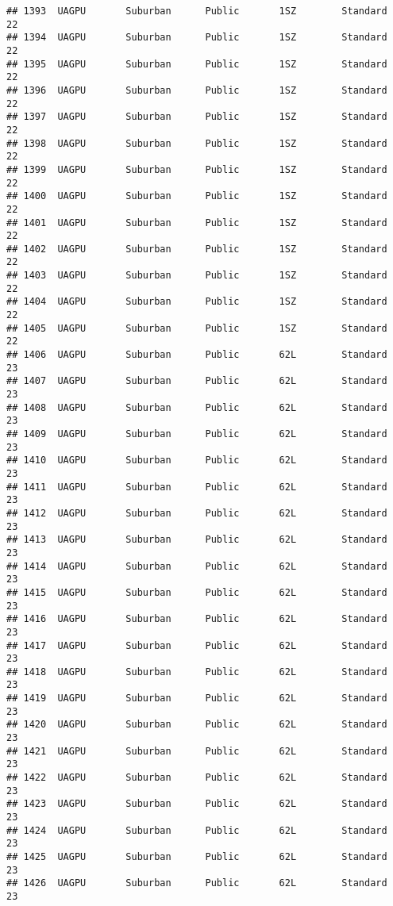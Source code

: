 \documentclass[
]{article}
\begin{document}
\begin{verbatim}
## 1393  UAGPU       Suburban      Public       1SZ        Standard        22
## 1394  UAGPU       Suburban      Public       1SZ        Standard        22
## 1395  UAGPU       Suburban      Public       1SZ        Standard        22
## 1396  UAGPU       Suburban      Public       1SZ        Standard        22
## 1397  UAGPU       Suburban      Public       1SZ        Standard        22
## 1398  UAGPU       Suburban      Public       1SZ        Standard        22
## 1399  UAGPU       Suburban      Public       1SZ        Standard        22
## 1400  UAGPU       Suburban      Public       1SZ        Standard        22
## 1401  UAGPU       Suburban      Public       1SZ        Standard        22
## 1402  UAGPU       Suburban      Public       1SZ        Standard        22
## 1403  UAGPU       Suburban      Public       1SZ        Standard        22
## 1404  UAGPU       Suburban      Public       1SZ        Standard        22
## 1405  UAGPU       Suburban      Public       1SZ        Standard        22
## 1406  UAGPU       Suburban      Public       62L        Standard        23
## 1407  UAGPU       Suburban      Public       62L        Standard        23
## 1408  UAGPU       Suburban      Public       62L        Standard        23
## 1409  UAGPU       Suburban      Public       62L        Standard        23
## 1410  UAGPU       Suburban      Public       62L        Standard        23
## 1411  UAGPU       Suburban      Public       62L        Standard        23
## 1412  UAGPU       Suburban      Public       62L        Standard        23
## 1413  UAGPU       Suburban      Public       62L        Standard        23
## 1414  UAGPU       Suburban      Public       62L        Standard        23
## 1415  UAGPU       Suburban      Public       62L        Standard        23
## 1416  UAGPU       Suburban      Public       62L        Standard        23
## 1417  UAGPU       Suburban      Public       62L        Standard        23
## 1418  UAGPU       Suburban      Public       62L        Standard        23
## 1419  UAGPU       Suburban      Public       62L        Standard        23
## 1420  UAGPU       Suburban      Public       62L        Standard        23
## 1421  UAGPU       Suburban      Public       62L        Standard        23
## 1422  UAGPU       Suburban      Public       62L        Standard        23
## 1423  UAGPU       Suburban      Public       62L        Standard        23
## 1424  UAGPU       Suburban      Public       62L        Standard        23
## 1425  UAGPU       Suburban      Public       62L        Standard        23
## 1426  UAGPU       Suburban      Public       62L        Standard        23

\end{verbatim}
\end{document}
